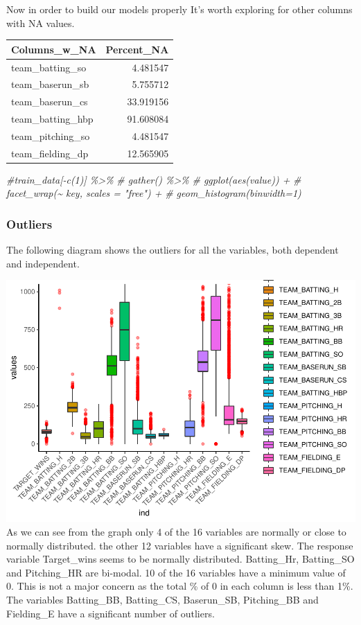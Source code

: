 \documentclass[
]{article}
\newenvironment{Shaded}{\begin{snugshade}}{\end{snugshade}}
\newcommand{\CommentTok}[1]{\textcolor[rgb]{0.56,0.35,0.01}{\textit{#1}}}
\begin{document}
Now in order to build our models properly It's worth exploring for other
columns with NA values.

\captionsetup[table]{labelformat=empty,skip=1pt}
\begin{longtable}{lr}
\toprule
Columns\_w\_NA & Percent\_NA \\ 
\midrule
team\_batting\_so & 4.481547 \\ 
team\_baserun\_sb & 5.755712 \\ 
team\_baserun\_cs & 33.919156 \\ 
team\_batting\_hbp & 91.608084 \\ 
team\_pitching\_so & 4.481547 \\ 
team\_fielding\_dp & 12.565905 \\ 
\bottomrule
\end{longtable}

\begin{Shaded}
\begin{Highlighting}[]
\CommentTok{\#train\_data[{-}c(1)] \%\textgreater{}\%}
\CommentTok{\#  gather() \%\textgreater{}\% }
\CommentTok{\#  ggplot(aes(value)) +}
\CommentTok{\#    facet\_wrap(\textasciitilde{} key, scales = "free") +}
\CommentTok{\#    geom\_histogram(binwidth=1)}
\end{Highlighting}
\end{Shaded}

\hypertarget{outliers}{%
\subsubsection{Outliers}\label{outliers}}

The following diagram shows the outliers for all the variables, both
dependent and independent.

\includegraphics{Assignment1_files/figure-latex/unnamed-chunk-8-1.pdf}
As we can see from the graph only 4 of the 16 variables are normally or
close to normally distributed. the other 12 variables have a significant
skew. The response variable Target\_wins seems to be normally
distributed. Batting\_Hr, Batting\_SO and Pitching\_HR are bi-modal. 10
of the 16 variables have a minimum value of 0. This is not a major
concern as the total \% of 0 in each column is less than 1\%. The
variables Batting\_BB, Batting\_CS, Baserun\_SB, Pitching\_BB and
Fielding\_E have a significant number of outliers.
\end{document}
